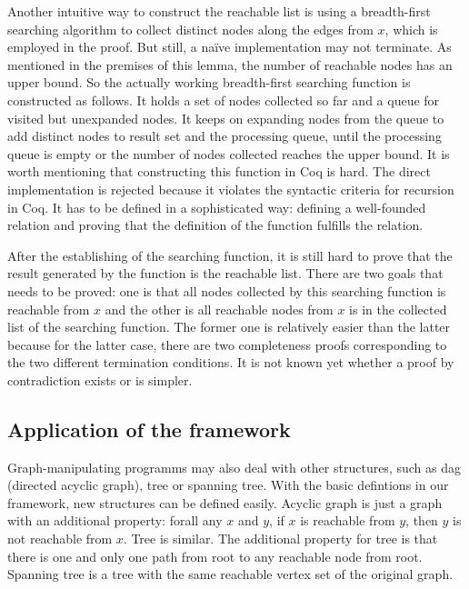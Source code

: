 Another intuitive way to construct the reachable list is using a
breadth-first searching algorithm to collect distinct nodes along the
edges from $x$, which is employed in the proof. But still, a na\"ive
implementation may not terminate. As mentioned in the premises of this
lemma, the number of reachable nodes has an upper bound. So the
actually working breadth-first searching function is constructed as
follows. It holds a set of nodes collected so far and a queue for
visited but unexpanded nodes. It keeps on expanding nodes from the
queue to add distinct nodes to result set and the processing queue,
until the processing queue is empty or the number of nodes collected
reaches the upper bound. It is worth mentioning that constructing this
function in Coq is hard. The direct implementation is rejected because
it violates the syntactic criteria for recursion in Coq. It has to be
defined in a sophisticated way: defining a well-founded relation and
proving that the definition of the function fulfills the relation.

After the establishing of the searching function, it is still hard to
prove that the result generated by the function is the reachable
list. There are two goals that needs to be proved: one is that all
nodes collected by this searching function is reachable from $x$ and
the other is all reachable nodes from $x$ is in the
collected list of the searching function. The former one is relatively
easier than the latter because for the latter case, there are two
completeness proofs corresponding to the two different termination
conditions. It is not known yet whether a proof by contradiction
exists or is simpler.

\subsection{Application of the framework}

Graph-manipulating programms may also deal with other structures, such
as dag (directed acyclic graph), tree or spanning tree. With the basic
defintions in our framework, new structures can be defined
easily. Acyclic graph is just a graph with an additional property:
forall any $x$ and $y$, if $x$ is reachable from $y$, then $y$ is not
reachable from $x$. Tree is similar. The additional property for tree
is that there is one and only one path from root to any reachable node
from root. Spanning tree is a tree with the same reachable vertex set
of the original graph.


